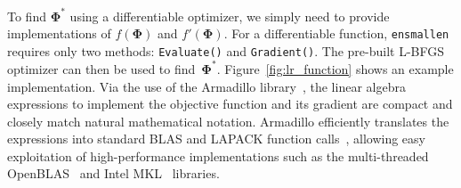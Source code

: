 \documentclass[twoside,11pt]{article}
\begin{document}

To find $\bm \Phi^*$ using a differentiable optimizer,
we simply need to provide implementations of $f(\bm \Phi)$ and $f'(\bm \Phi)$.
For a differentiable function, {\tt ensmallen} requires only two methods:
{\tt Evaluate()} and {\tt Gradient()}.
The pre-built L-BFGS optimizer can then be used to find~$\bm \Phi^*$.
Figure~\ref{fig:lr_function} shows an example implementation.
Via the use of the Armadillo library~\citep{sanderson2016armadillo},
the linear algebra expressions to implement the objective function and its gradient
are compact and closely match natural mathematical notation.
Armadillo efficiently translates the expressions into standard BLAS and LAPACK function calls~\citep{anderson1999lapack},
allowing easy exploitation of high-performance implementations such as the multi-threaded \mbox{OpenBLAS}~\citep{OpenBLAS} and Intel MKL~\citep{IntelMKL} libraries.






\end{document}
